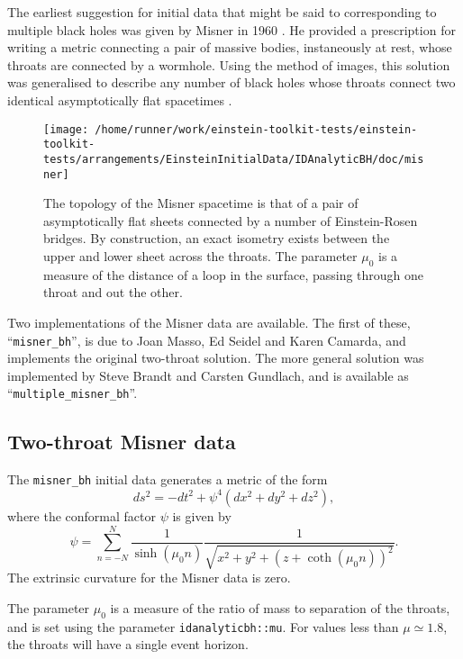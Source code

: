 \documentclass{article}
\begin{document}
The earliest suggestion for initial data that might be said to
corresponding to multiple black holes was given by Misner in 1960
\cite{CactusEinstein_IDAnalyticBH_misner:1960}. He provided a prescription for writing a metric
connecting a pair of massive bodies, instaneously at rest, whose
throats are connected by a wormhole. Using the method of images, this
solution was generalised to describe any number of black holes whose
throats connect two identical asymptotically flat spacetimes
\cite{CactusEinstein_IDAnalyticBH_misner:1963}.
\begin{figure}
  \centering
  \texttt{[image: /home/runner/work/einstein-toolkit-tests/einstein-toolkit-tests/arrangements/EinsteinInitialData/IDAnalyticBH/doc/misner]}
  \caption{The topology of the Misner spacetime is that of a pair of
  asymptotically flat sheets connected by a number of Einstein-Rosen
  bridges. By construction, an exact isometry exists between the upper
  and lower sheet across the throats. The parameter $\mu_0$ is a
  measure of the distance of a loop in the surface, passing through
  one throat and out the other.}
\end{figure}

Two implementations of the Misner data are available. The first of
these, ``\texttt{misner\_bh}'', is due to Joan Masso, Ed Seidel and
Karen Camarda, and implements the original two-throat solution. The
more general solution was implemented by Steve Brandt and Carsten
Gundlach, and is available as ``\texttt{multiple\_misner\_bh}''.

\subsection{Two-throat Misner data}

The \texttt{misner\_bh} initial data generates a metric of the form
\begin{equation}
  ds^2 = -dt^2 + \psi^4 (dx^2 + dy^2 + dz^2),
\end{equation}
where the conformal factor $\psi$ is given by
\begin{equation}
  \psi = \sum^N_{n=-N}
  \frac{1}{\sinh(\mu_0 n)}
  \frac{1}{\sqrt{x^2 + y^2 + (z + \coth(\mu_0 n))^2}}.
\end{equation}
The extrinsic curvature for the Misner data is zero.

The parameter $\mu_0$ is a measure of the ratio of mass to separation
of the throats, and is set using the parameter
\texttt{idanalyticbh::mu}. For values less than $\mu\simeq 1.8$, the
throats will have a single event horizon.
\end{document}
